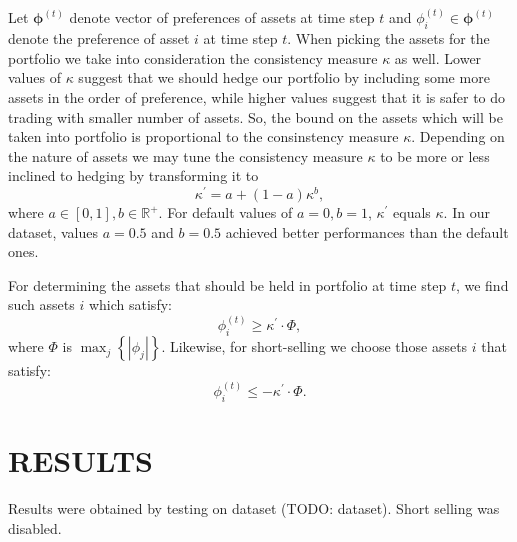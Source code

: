\documentclass[letterpaper, 10 pt, conference]{ieeeconf}
\newcommand{\matr}[1]{\mathbold{#1}}
\begin{document}
  Let $\matr{\phi}^{(t)}$ denote vector of preferences of assets at time step $t$ and $\phi_i^{(t)} \in \matr{\phi}^{(t)}$ denote the preference of asset $i$ at time step $t$.
  When picking the assets for the portfolio we take into consideration the consistency measure $\kappa$ as well.
  Lower values of $\kappa$ suggest that we should hedge our portfolio by including some more assets in the order of preference, while higher values suggest that it is safer to do trading with smaller number of assets.
  So, the bound on the assets which will be taken into portfolio is proportional to the consinstency measure $\kappa$.
  Depending on the nature of assets we may tune the consistency measure $\kappa$ to be more or less inclined to hedging by transforming it to
  \begin{equation}
    \kappa^\prime = a + (1 - a)\kappa^b,
  \end{equation}
  where $a \in [0, 1], b \in \mathbb{R}^+$.
  For default values of $a = 0, b = 1$, $\kappa^\prime$ equals $\kappa$.
  In our dataset, values $a = 0.5$ and $b = 0.5$ achieved better performances than the default ones.
  
  For determining the assets that should be held in portfolio at time step $t$, we find such assets $i$ which satisfy:
  \begin{equation}
    \phi_i^{(t)} \ge \kappa^\prime \cdot \Phi,
  \end{equation}
  where $\Phi$ is $\max_j \left\{ \left| \phi_j \right| \right\}$.
  Likewise, for short-selling we choose those assets $i$ that satisfy:
  \begin{equation}
    \phi_i^{(t)} \le -\kappa^\prime \cdot \Phi.
  \end{equation}
  
  \section{RESULTS}
  
  Results were obtained by testing on dataset (TODO: dataset).
  Short selling was disabled.
  
\end{document}
